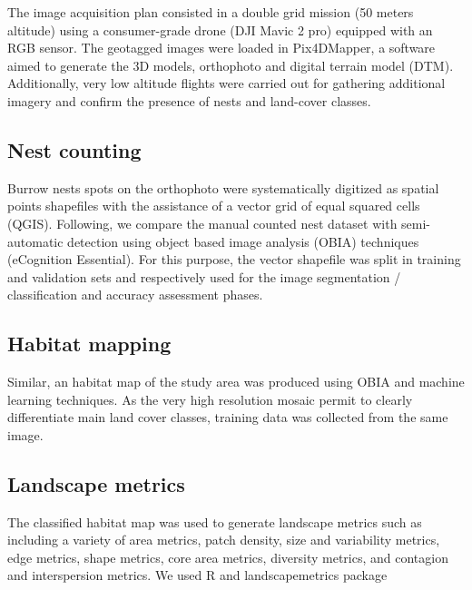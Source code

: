 \documentclass[12pt]{article}
\begin{document}
The image acquisition plan consisted in a double grid mission (50 meters altitude) using a consumer-grade drone (DJI Mavic 2 pro) equipped with an RGB sensor. The geotagged images were loaded in Pix4DMapper, a software aimed to generate the 3D models, orthophoto and digital terrain model (DTM). Additionally, very low altitude flights were carried out for gathering additional imagery and confirm the presence of nests and  land-cover classes.

\subsection{Nest counting}

Burrow nests spots on the orthophoto were systematically digitized as spatial points shapefiles with the assistance of a  vector grid of equal squared cells (QGIS). Following, we compare the manual counted nest dataset with semi-automatic detection using object based image analysis (OBIA) techniques (eCognition Essential). For this purpose, the vector shapefile was split in training and validation sets and respectively used for the image segmentation / classification and accuracy assessment phases.

\subsection{Habitat mapping}

Similar, an habitat map of the study area was produced using OBIA and machine learning techniques. As the very high resolution mosaic permit to clearly differentiate main land cover classes, training data was collected from the same image. 

\subsection{Landscape metrics}

The classified habitat map was used to generate landscape metrics such as including a variety of area metrics, patch density, size and variability metrics, edge metrics, shape metrics, core area metrics, diversity metrics, and contagion and interspersion metrics. We used \textsf{R} \cite{R_2021} and landscapemetrics package \cite{landscapemetrics_2019} 


\end{document}
